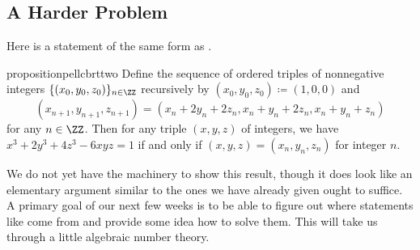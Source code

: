 \documentclass[../notes.tex]{subfiles}
\begin{document}

\subsection{A Harder Problem}
Here is a statement of the same form as .
\begin{restatable}{proposition}{pellcbrttwo} \label{prop:pell-cbrt-2}
	Define the sequence of ordered triples of nonnegative integers $\{(x_0,y_0,z_0)\}_{n\in\ZZ}$ recursively by $(x_0,y_0,z_0)\coloneqq(1,0,0)$ and
	\[(x_{n+1},y_{n+1},z_{n+1})=(x_n+2y_n+2z_n,x_n+y_n+2z_n,x_n+y_n+z_n)\]
	for any $n\in\ZZ$. Then for any triple $(x,y,z)$ of integers, we have $x^3+2y^3+4z^3-6xyz=1$ if and only if $(x,y,z)=(x_n,y_n,z_n)$ for integer $n$.
\end{restatable}
We do not yet have the machinery to show this result, though it does look like an elementary argument similar to the ones we have already given ought to suffice. A primary goal of our next few weeks is to be able to figure out where statements like  come from and provide some idea how to solve them. This will take us through a little algebraic number theory.
\end{document}
